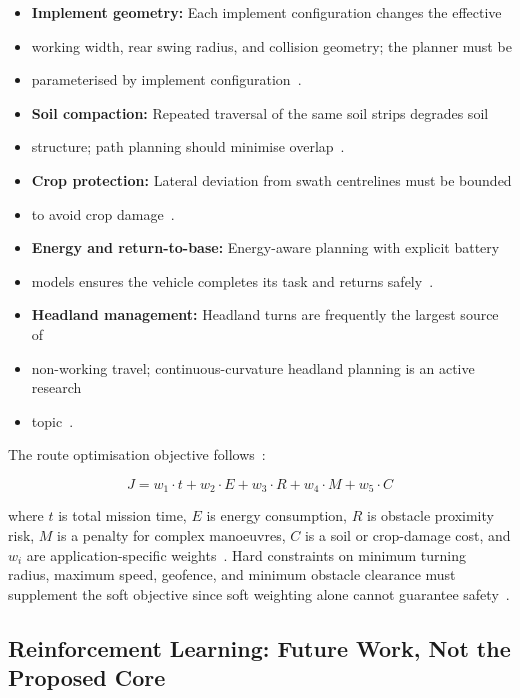 \documentclass[12pt, a4paper]{article}
\begin{document}
\begin{itemize}
  \item \textbf{Implement geometry:} Each implement configuration changes the effective
  \item working width, rear swing radius, and collision geometry; the planner must be
  \item parameterised by implement configuration~\cite{ref2}.
  \item \textbf{Soil compaction:} Repeated traversal of the same soil strips degrades soil
  \item structure; path planning should minimise overlap~\cite{ref103, ref105}.
  \item \textbf{Crop protection:} Lateral deviation from swath centrelines must be bounded
  \item to avoid crop damage~\cite{ref103, ref105}.
  \item \textbf{Energy and return-to-base:} Energy-aware planning with explicit battery
  \item models ensures the vehicle completes its task and returns safely~\cite{ref108, ref131}.
  \item \textbf{Headland management:} Headland turns are frequently the largest source of
  \item non-working travel; continuous-curvature headland planning is an active research
  \item topic~\cite{ref132}.
\end{itemize}

The route optimisation objective follows~\cite{ref2}:

\begin{equation}
  J = w_1 \cdot t + w_2 \cdot E + w_3 \cdot R + w_4 \cdot M + w_5 \cdot C
  \label{eq:cost}
\end{equation}

where $t$ is total mission time, $E$ is energy consumption, $R$ is obstacle proximity
risk, $M$ is a penalty for complex manoeuvres, $C$ is a soil or crop-damage cost, and
$w_i$ are application-specific weights~\cite{ref2}. Hard constraints on minimum turning
radius, maximum speed, geofence, and minimum obstacle clearance must supplement the soft
objective since soft weighting alone cannot guarantee safety~\cite{ref2}.

\subsection{Reinforcement Learning: Future Work, Not the Proposed Core}
\end{document}
